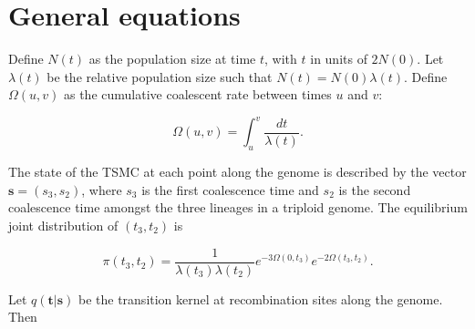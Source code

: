 \documentclass{article}
\begin{document}
\section{General equations}

Define $N(t)$ as the population size at time $t$, with $t$ in units of $2N(0)$.
Let $\lambda(t)$ be the relative population size such that $N(t) =
N(0)\lambda(t)$. Define $\Omega(u,v)$ as the cumulative coalescent rate between
times $u$ and $v$:

\begin{equation}
    \Omega(u,v) = \int_u^v \frac{dt}{\lambda(t)}.
\end{equation}

The state of the TSMC at each point along the genome is described by the vector
$\boldsymbol{s} = (s_3,s_2)$, where $s_3$ is the first coalescence time and
$s_2$ is the second coalescence time amongst the three lineages in a triploid
genome. The equilibrium joint distribution of $(t_3,t_2)$ is

\begin{equation}
    \pi(t_3,t_2) = \frac{1}{\lambda(t_3)\lambda(t_2)}e^{-3\Omega(0,t_3)}e^{-2\Omega(t_3,t_2)}.
    \label{eq:equilibriumjointdistn}
\end{equation}

Let $q(\boldsymbol{t}|\boldsymbol{s})$ be the transition kernel at
recombination sites along the genome. Then
\end{document}
